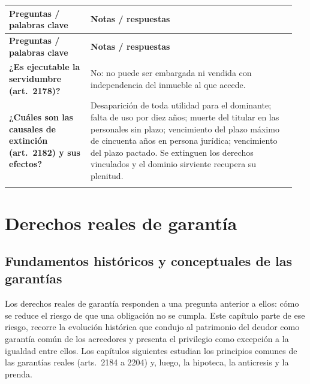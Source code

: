 \documentclass[12pt,oneside]{book}
\makeatletter
\newenvironment{cornell}{%
    \par\vspace{0.5em}
    \noindent
    \begin{longtable}{@{}>{\raggedright\arraybackslash}p{0.27\linewidth}
                         >{\raggedright\arraybackslash}p{0.68\linewidth}@{}}
    \toprule
    \textbf{Preguntas / palabras clave} & \textbf{Notas / respuestas} \\
    \midrule
    \endfirsthead
    \toprule
    \textbf{Preguntas / palabras clave} & \textbf{Notas / respuestas} \\
    \midrule
    \endhead
}{%
    \bottomrule
    \end{longtable}
}
\newcommand{\cornellsummary}[1]{%
    \midrule
    \multicolumn{2}{@{}p{\dimexpr0.95\linewidth+2\tabcolsep\relax}@{}}{%
        \vspace{0.2em}\textbf{Resumen:} #1\vspace{0.2em}} \\
}
\makeatother
\begin{document}
\begin{cornell}
\textbf{¿Es ejecutable la servidumbre (art.~2178)?} &
No: no puede ser embargada ni vendida con independencia del inmueble al que accede. \\

\textbf{¿Cuáles son las causales de extinción (art.~2182) y sus efectos?} &
Desaparición de toda utilidad para el dominante; falta de uso por diez años; muerte del titular en las personales sin plazo; vencimiento del plazo máximo de cincuenta años en persona jurídica; vencimiento del plazo pactado. Se extinguen los derechos vinculados y el dominio sirviente recupera su plenitud. \\

\cornellsummary{La servidumbre vincula dos fundos de distinta titularidad: el dominante recibe una utilidad y el sirviente la presta mediante un permitir o abstenerse, nunca un hacer. Se clasifica en positivas y negativas, reales y personales, forzosas y convencionales. Se constituye por escritura pública, la transmiten con el inmueble las reales y se extingue la personal, es inembargable con independencia del fundo (art.~2178) y se extingue por las causales del art.~2182, tras lo cual el dominio sirviente recupera su plenitud.}
\end{cornell}

\part{Derechos reales de garantía}

\chapter{Fundamentos históricos y conceptuales de las garantías}\label{cap:garantias-fund}

Los derechos reales de garantía responden a una pregunta anterior a ellos: cómo se reduce el riesgo de que una obligación no se cumpla. Este capítulo parte de ese riesgo, recorre la evolución histórica que condujo al patrimonio del deudor como garantía común de los acreedores y presenta el privilegio como excepción a la igualdad entre ellos. Los capítulos siguientes estudian los principios comunes de las garantías reales (arts.~2184 a 2204) y, luego, la hipoteca, la anticresis y la prenda.
\end{document}

